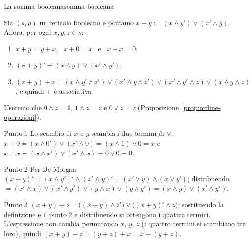 \begin{concetto}
\begin{Lemma}{La somma booleana}{somma-booleana}
    \begin{prerequisiti}
    \end{prerequisiti}
    Sia $(s, \rho)$ un reticolo booleano e poniamo $x + y := (x \wedge y') \vee (x' \wedge y)$. Allora, per ogni $x, y, z \in s$:
    \begin{enumerate}
        \item $x + y = y + x$, \ $x + 0 = x$ \ e \ $x + x = 0$;
        \item $(x + y)' = (x \wedge y) \vee (x' \wedge y')$;
        \item $(x + y) + z = (x \wedge y' \wedge z') \vee (x' \wedge y \wedge z') \vee (x' \wedge y' \wedge z) \vee (x \wedge y \wedge z)$, e quindi $+$ è associativa.
    \end{enumerate}
\end{Lemma}
\begin{dimostrazione}
    Useremo che $0 \wedge z = 0$, $1 \wedge z = z$ e $0 \vee z = z$ (Proposizione~\ref{prop:ordine-operazioni}).
    \begin{caso}{Punto 1}
        Lo scambio di $x$ e $y$ scambia i due termini di $\vee$. $x + 0 = (x \wedge 0') \vee (x' \wedge 0) = (x \wedge 1) \vee 0 = x$ e $x + x = (x \wedge x') \vee (x' \wedge x) = 0 \vee 0 = 0$.
    \end{caso}
    \begin{caso}{Punto 2}
        Per De Morgan $(x + y)' = (x \wedge y')' \wedge (x' \wedge y)' = (x' \vee y) \wedge (x \vee y')$; distribuendo,
        $= (x' \wedge x) \vee (x' \wedge y') \vee (y \wedge x) \vee (y \wedge y') = (x \wedge y) \vee (x' \wedge y')$.
    \end{caso}
    \begin{caso}{Punto 3}
        $(x + y) + z = \big((x + y) \wedge z'\big) \vee \big((x + y)' \wedge z\big)$; sostituendo la definizione e il punto 2 e distribuendo si ottengono i quattro termini.
        L'espressione non cambia permutando $x$, $y$, $z$ (i quattro termini si scambiano tra loro), quindi $(x + y) + z = (y + z) + x = x + (y + z)$.
    \end{caso}
\end{dimostrazione}
\end{concetto}

